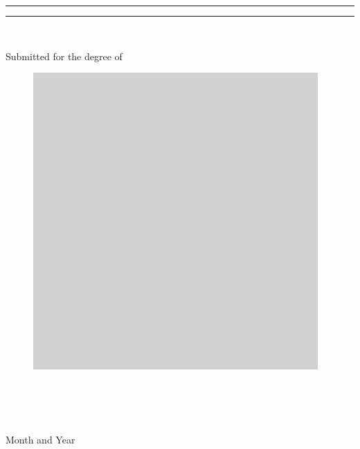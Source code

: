 \begin{titlepage}

\begin{center}
\rule{\linewidth}{1pt}

\textsc{\Large\thesistitle}

\rule{\linewidth}{1pt}

\vfill

\begin{Large}\textbf{\name}\end{Large} \\
[3ex]\begin{large}Submitted for the degree of \degree\end{large}

\vfill

\begin{figure}[h!]
 \centering
 \includegraphics[scale=0.4]{titlepage/logo-placeholder}
\end{figure}

\vfill
\begin{Large}\researchgroup\end{Large} \\
[2ex]\begin{Large}\department\end{Large} \\
[2ex]{\LARGE\university}\\
[5ex]{Month and Year}
\end{center}

\end{titlepage}

%
%
